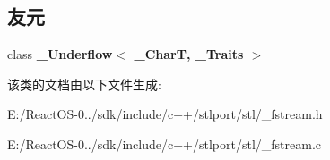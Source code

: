 \subsection*{友元}
\begin{DoxyCompactItemize}
\item 
\mbox{\label{classbasic__filebuf_aa498f18218e93c04452e787f9dd0bbc7}} 
class {\bfseries \+\_\+\+Underflow$<$ \+\_\+\+Char\+T, \+\_\+\+Traits $>$}
\end{DoxyCompactItemize}


该类的文档由以下文件生成\+:\begin{DoxyCompactItemize}
\item 
E\+:/\+React\+O\+S-\/0../sdk/include/c++/stlport/stl/\+\_\+fstream.\+h\item 
E\+:/\+React\+O\+S-\/0../sdk/include/c++/stlport/stl/\+\_\+fstream.\+c\end{DoxyCompactItemize}
